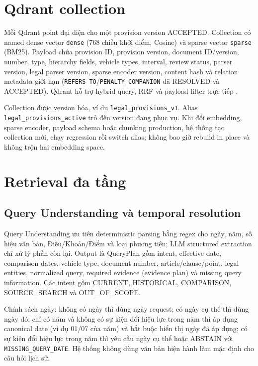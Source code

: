 \documentclass[a4paper,12pt]{extreport}
\newcommand{\code}[1]{\texttt{#1}}
\begin{document}
\section{Qdrant collection}

Mỗi Qdrant point đại diện cho một provision version ACCEPTED. Collection có named dense vector \code{dense} (768 chiều khởi điểm, Cosine) và sparse vector \code{sparse} (BM25). Payload chứa provision ID, provision version, document ID/version, number, type, hierarchy fields, vehicle types, interval, review status, parser version, legal parser version, sparse encoder version, content hash và relation metadata giới hạn (\code{REFERS\_TO}/\code{PENALTY\_COMPANION} đã RESOLVED và ACCEPTED). Qdrant hỗ trợ hybrid query, RRF và payload filter trực tiếp \cite{qdrant2026hybrid}.

Collection được version hóa, ví dụ \code{legal\_provisions\_v1}. Alias \code{legal\_provisions\_active} trỏ đến version đang phục vụ. Khi đổi embedding, sparse encoder, payload schema hoặc chunking production, hệ thống tạo collection mới, chạy regression rồi switch alias; không bao giờ rebuild in place và không trộn hai embedding space.

\section{Retrieval đa tầng}

\subsection{Query Understanding và temporal resolution}

Query Understanding ưu tiên deterministic parsing bằng regex cho ngày, năm, số hiệu văn bản, Điều/Khoản/Điểm và loại phương tiện; LLM structured extraction chỉ xử lý phần còn lại. Output là QueryPlan gồm intent, effective date, comparison dates, vehicle type, document number, article/clause/point, legal entities, normalized query, required evidence (evidence plan) và missing query information. Các intent gồm CURRENT, HISTORICAL, COMPARISON, SOURCE\_SEARCH và OUT\_OF\_SCOPE.

Chính sách ngày: không có ngày thì dùng ngày request; có ngày cụ thể thì dùng ngày đó; chỉ có năm và không có sự kiện đổi hiệu lực trong năm thì áp dụng canonical date (ví dụ 01/07 của năm) và bắt buộc hiển thị ngày đã áp dụng; có sự kiện đổi hiệu lực trong năm thì yêu cầu ngày cụ thể hoặc ABSTAIN với \code{MISSING\_QUERY\_DATE}. Hệ thống không dùng văn bản hiện hành làm mặc định cho câu hỏi lịch sử.
\end{document}

